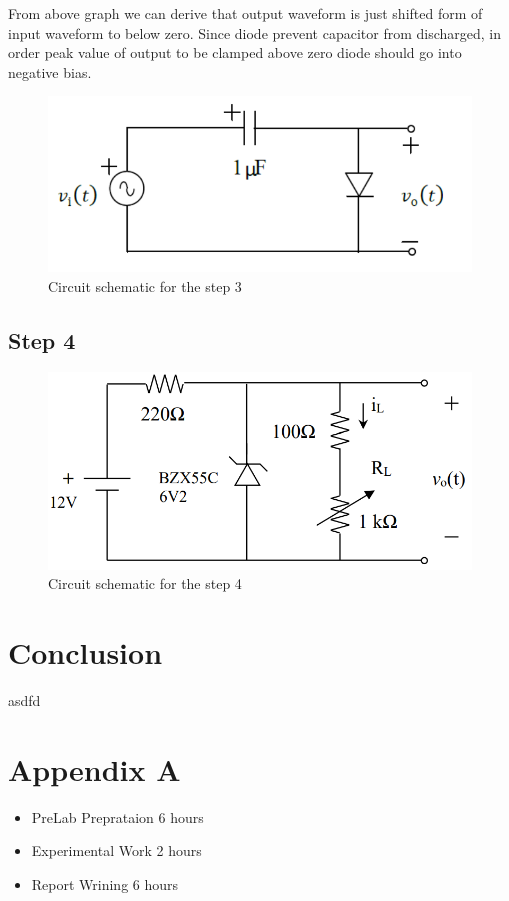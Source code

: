 \documentclass[letterpaper,12pt]{article}
\begin{document}
From above graph we can derive that output waveform is just shifted form of input waveform to below zero. Since diode prevent capacitor from discharged, in order peak value of output to be clamped above zero diode should go into negative bias.

\begin{figure}[H]
    \centering
    \includegraphics[width=1\textwidth]{3_1.png}
    \caption{Circuit schematic for the step 3}
\end{figure} 
    
    

\subsection{Step 4}

\begin{figure}[H]
    \centering
    \includegraphics[width=1\textwidth]{4_1.png}
    \caption{Circuit schematic for the step 4}
\end{figure} 
    
    
\section{Conclusion}
asdfd
\section*{Appendix A}
\begin{itemize}
    \item PreLab Preprataion 6 hours
    \item Experimental Work 2  hours
    \item Report Wrining 6 hours
\end{itemize}
\end{document}
